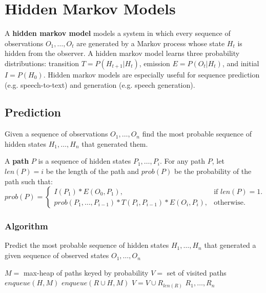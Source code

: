 \documentclass[../main.tex]{subfiles}
\begin{document}
\section{Hidden Markov Models}
\begin{definition}
A \textbf{hidden markov model} models a system in which every sequence of observations $O_1, \ldots, O_t$ are generated by a Markov process whose state $H_t$ is hidden from the observer. A hidden markov model learns three probability distributions: transition $T = P(H_{t+1} | H_{t})$, emission $E = P(O_{t} | H_{t})$, and initial $I = P(H_{0})$. Hidden markov models are especially useful for sequence prediction (e.g. speech-to-text) and generation (e.g. speech generation).
\end{definition}

\subsection{Prediction}
Given a sequence of observations $O_1, \ldots, O_n$ find the most probable sequence of hidden states $H_1, \ldots, H_n$ that generated them.

\begin{definition}
A \textbf{path} $P$ is a sequence of hidden states $P_1, \ldots, P_i$. For any path $P$, let $len(P) = i$ be the length of the path and $prob(P)$ be the probability of the path such that:
\begin{equation*}
  prob(P)=\begin{cases}
    I(P_1) * E(O_0, P_1), & \text{if $len(P) = 1$}.\\
    prob(P_1, \ldots, P_{i-1}) * T(P_i, P_{i-1}) * E(O_i, P_i), & \text{otherwise}.
  \end{cases}
\end{equation*}
\end{definition}

\subsubsection{Algorithm}
\begin{algorithm}[H]
\caption{Predict the most probable sequence of hidden states $H_1, \ldots, H_n$ that generated a given sequence of observed states $O_1, \ldots, O_n$}
\label{hmm-predict}
\begin{algorithmic}
    \State $M = $ max-heap of paths keyed by probability
    \State $V = $ set of visited paths
        \State $enqueue(H, M)$
    \EndFor
                \State $enqueue(R \cup H, M)$
                \State $V = V \cup R_{len(R)}$
            \EndFor
        \EndIf
    \EndWhile
    \State\Return $R_1, \ldots, R_n$
\EndFunction
\end{algorithmic}
\end{algorithm}
\end{document}
